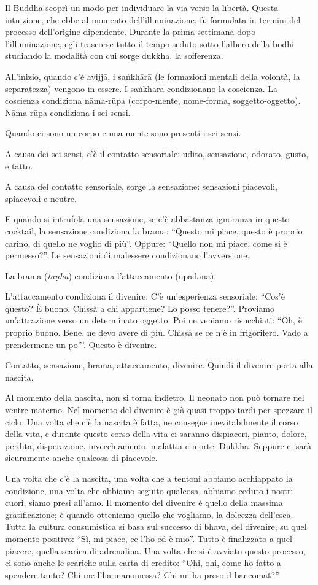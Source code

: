 Il Buddha scoprì un modo per individuare la via verso la libertà. Questa intuizione, che ebbe al momento dell'illuminazione, fu formulata in termini del processo dell'origine dipendente. Durante la prima settimana dopo l'illuminazione, egli trascorse tutto il tempo seduto sotto l'albero della bodhi studiando la modalità con cui sorge dukkha, la sofferenza.

All'inizio, quando c'è avijjā, i saṅkhārā (le formazioni mentali della volontà, la separatezza) vengono in essere. I saṅkhārā condizionano la coscienza. La coscienza condiziona nāma-rūpa (corpo-mente, nome-forma, soggetto-oggetto). Nāma-rūpa condiziona i sei sensi.

Quando ci sono un corpo e una mente sono presenti i sei sensi.

A causa dei sei sensi, c'è il contatto sensoriale: udito, sensazione, odorato, gusto, e tatto.

A causa del contatto sensoriale, sorge la sensazione: sensazioni piacevoli, spiacevoli e neutre.

E quando si intrufola una sensazione, se c'è abbastanza ignoranza in questo cocktail, la sensazione condiziona la brama: ``Questo mi piace, questo è proprio carino, di quello ne voglio di più''. Oppure: ``Quello non mi piace, come si è permesso?''. Le sensazioni di malessere condizionano l'avversione.

La brama (\textit{taṇhā}) condiziona l'attaccamento (upādāna).

L'attaccamento condiziona il divenire. C'è un'esperienza sensoriale: ``Cos'è questo? È buono. Chissà a chi appartiene? Lo posso tenere?''. Proviamo un'attrazione verso un determinato oggetto. Poi ne veniamo risucchiati: ``Oh, è proprio buono. Bene, ne devo avere di più. Chissà se ce n'è in frigorifero. Vado a prendermene un po''\thinspace'. Questo è divenire. 

Contatto, sensazione, brama, attaccamento, divenire. Quindi il divenire porta alla nascita.

Al momento della nascita, non si torna indietro. Il neonato non può tornare nel ventre materno. Nel momento del divenire è già quasi troppo tardi per spezzare il ciclo. Una volta che c'è la nascita è fatta, ne consegue inevitabilmente il corso della vita, e durante questo corso della vita ci saranno dispiaceri, pianto, dolore, perdita, disperazione, invecchiamento, malattia e morte. Dukkha. Seppure ci sarà sicuramente anche qualcosa di piacevole.

Una volta che c'è la nascita, una volta che a tentoni abbiamo acchiappato la condizione, una volta che abbiamo seguito qualcosa, abbiamo ceduto i nostri cuori, siamo presi all'amo. Il momento del divenire è quello della massima gratificazione; è quando otteniamo quello che vogliamo, la dolcezza dell'esca. Tutta la cultura consumistica si basa sul successo di bhava, del divenire, su quel momento positivo: ``Sì, mi piace, ce l'ho ed è mio''. Tutto è finalizzato a quel piacere, quella scarica di adrenalina. Una volta che si è avviato questo processo, ci sono anche le scariche sulla carta di credito: ``Ohi, ohi, come ho fatto a spendere tanto? Chi me l'ha manomessa? Chi mi ha preso il bancomat?''.

